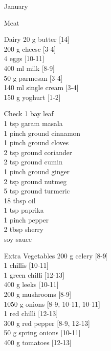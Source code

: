 \begin{menu}{January}
\begin{shoppinglist}{Meat}
      \end{shoppinglist}%
      \begin{shoppinglist}{Dairy}
      20 g butter {\scriptsize[14]}\\
      200 g cheese {\scriptsize[3-4]}\\
      4  eggs {\scriptsize[10-11]}\\
      400 ml milk {\scriptsize[8-9]}\\
      50 g parmesan {\scriptsize[3-4]}\\
      140 ml single cream {\scriptsize[3-4]}\\
      150 g yoghurt {\scriptsize[1-2]}\\
      \end{shoppinglist}%
      \par\vfil %
      \vfil\clearpage %
      \begin{shoppinglist}{Check}
      1  bay leaf \\
      1 tsp garam masala \\
      1 pinch ground cinnamon \\
      1 pinch ground cloves \\
      2 tsp ground coriander \\
      2 tsp ground cumin \\
      1 pinch ground ginger \\
      2 tsp ground nutmeg \\
      5 tsp ground turmeric \\
      18 tbsp oil \\
      1 tsp paprika \\
      1 pinch pepper \\
      2 tbsp sherry \\
       soy sauce \\
      \end{shoppinglist}%
      \begin{shoppinglist}{Extra Vegetables}
      200 g celery {\scriptsize[8-9]}\\
      1  chillis {\scriptsize[10-11]}\\
      1  green chilli {\scriptsize[12-13]}\\
      400 g leeks {\scriptsize[10-11]}\\
      200 g mushrooms {\scriptsize[8-9]}\\
      1050 g onions {\scriptsize[8-9, 10-11, 10-11]}\\
      1  red chilli {\scriptsize[12-13]}\\
      300 g red pepper {\scriptsize[8-9, 12-13]}\\
      50 g spring onions {\scriptsize[10-11]}\\
      400 g tomatoes {\scriptsize[12-13]}\\
      \end{shoppinglist}%
      \par\vfil %
    \vfil\clearpage
  

\end{menu}

